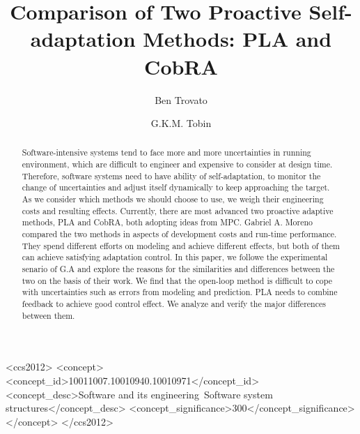 \documentclass[sigconf]{acmart}
\begin{document}
\title{Comparison of Two Proactive Self-adaptation Methods: PLA and CobRA}


\author{Ben Trovato}
\author{G.K.M. Tobin}
\authornotemark[1]

\author{}

\author{}
%
%

\begin{abstract}
Software-intensive systems tend to face more and more uncertainties in running environment, which are difficult to engineer and expensive to consider at design time. Therefore, software systems need to have ability of self-adaptation, to monitor the change of uncertainties and adjust itself dynamically to keep approaching the target. As we consider which methods we should choose to use, we weigh their engineering costs and resulting effects. Currently, there are most advanced two proactive adaptive methods, PLA\cite{pla} and CobRA\cite{cobra}, both adopting ideas from MPC. Gabriel A. Moreno compared the two methods in aspects of development costs and run-time performance\cite{GA}. They spend different efforts on modeling and achieve different effects, but both of them can achieve satisfying adaptation control. In this paper, we followe the experimental senario of G.A and explore the reasons for the similarities and differences between the two on the basis of their work. We find that the open-loop method is difficult to cope with uncertainties such as errors from modeling and prediction. PLA needs to combine feedback to achieve good control effect. We analyze and verify the major differences between them.
\end{abstract}

\begin{CCSXML}
	<ccs2012>
	<concept>
	<concept_id>10011007.10010940.10010971</concept_id>
	<concept_desc>Software and its engineering~Software system structures</concept_desc>
	<concept_significance>300</concept_significance>
	</concept>
	</ccs2012>
\end{CCSXML}
\end{document}
